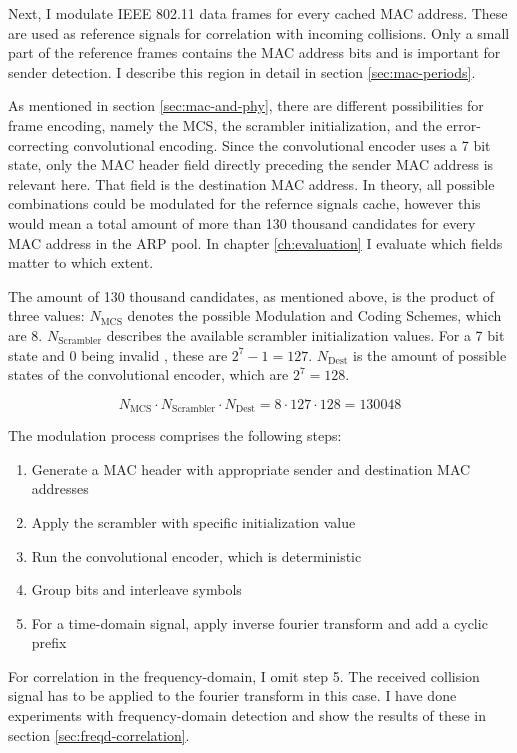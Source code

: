 Next, I modulate IEEE 802.11 data frames for every cached MAC address. These are used as reference signals for correlation with incoming collisions. Only a small part of the reference frames contains the MAC address bits and is important for sender detection. I describe this region in detail in section \ref{sec:mac-periods}.

As mentioned in section \ref{sec:mac-and-phy}, there are different possibilities for frame encoding, namely the \gls{MCS}, the scrambler initialization, and the error-correcting convolutional encoding. Since the convolutional encoder uses a 7 bit state, only the MAC header field directly preceding the sender MAC address is relevant here. That field is the destination MAC address. In theory, all possible combinations could be modulated for the refernce signals cache, however this would mean a total amount of  more than 130 thousand candidates for every MAC address in the ARP pool. In chapter \ref{ch:evaluation} I evaluate which fields matter to which extent.

The amount of 130 thousand candidates, as mentioned above, is the product of three values: $ N_{\text{MCS}} $ denotes the possible Modulation and Coding Schemes, which are 8. $ N_{\text{Scrambler}} $ describes the available scrambler initialization values. For a 7 bit state and 0 being invalid \cite{ieee2012}, these are $ 2^7 - 1 = 127 $. $ N_{\text{Dest}} $ is the amount of possible states of the convolutional encoder, which are $ 2^7 = 128 $.

$$ N_{\text{MCS}} \cdot N_{\text{Scrambler}} \cdot N_{\text{Dest}} = 8 \cdot 127 \cdot 128 = 130 048 $$\vspace{0cm}

The modulation process comprises the following steps:

\begin{enumerate}
	\item Generate a MAC header with appropriate sender and destination MAC addresses
	\item Apply the scrambler with specific initialization value
	\item Run the convolutional encoder, which is deterministic
	\item Group bits and interleave symbols
	\item For a time-domain signal, apply inverse fourier transform and add a cyclic prefix
\end{enumerate}

For correlation in the frequency-domain, I omit step 5. The received collision signal has to be applied to the fourier transform in this case. I have done experiments with frequency-domain detection and show the results of these in section \ref{sec:freqd-correlation}.\\

